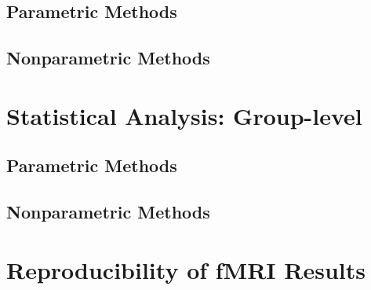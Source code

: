 \subsection{Parametric Methods}

\subsection{Nonparametric Methods}

\section{Statistical Analysis: Group-level}

\subsection{Parametric Methods}

\subsection{Nonparametric Methods}

\section{Reproducibility of fMRI Results}

